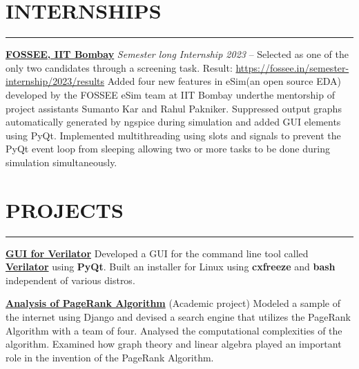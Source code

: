 \documentclass[letterpaper,MMMyyyy,nonstopmode]{simpleresumecv}
\begin{document}
    \section*{INTERNSHIPS}
        \hrule \vspace{8pt}
        {\href{https://fossee.in}{\textbf{\large FOSSEE, IIT Bombay}}
        \newline\textit{\large Semester long Internship 2023}
        }
        \hfill
        { --
        }
        \BulletItem
            Selected as one of the only two candidates through a screening task.
            \newline Result: \href{https://fossee.in/semester-internship/2023/results}{https://fossee.in/semester-internship/2023/results}
        \BulletItem
            Added four new features in eSim(an open source EDA) developed by the FOSSEE eSim team at IIT Bombay under\newline the mentorship of project assistants Sumanto Kar and Rahul Pakniker.
        \BulletItem
            Suppressed output graphs automatically generated by ngspice during simulation and added GUI elements using PyQt.
        \BulletItem
            Implemented multithreading using slots and signals to prevent the PyQt event loop from sleeping allowing two or more tasks to be done during simulation simultaneously.

    \section*{PROJECTS}
        \hrule \vspace{8pt}
        {\href{https://github.com/pranavkaruvally/linux_package_management_system}
        {\textbf{\large GUI for Verilator}} 
        } \hfill
        \BulletItem
            Developed a GUI for the command line tool called \href{https://www.veripool.org/verilator/}
            {\bfseries Verilator} using \textbf{PyQt}.
        \BulletItem
            Built an installer for Linux using \textbf{cxfreeze} and \textbf{bash} independent of various distros.
        \vspace{5pt}
        
        {\href{https://github.com/pranavkaruvally/PageRankProject}
        {\textbf{\large Analysis of PageRank Algorithm}} 
        (Academic project)
        } \hfill
        \BulletItem
            Modeled a sample of the internet using Django and devised a search engine that utilizes the PageRank \\ Algorithm with a team of four.
        \BulletItem
            Analysed the computational complexities of the algorithm.
        \BulletItem
            Examined how graph theory and linear algebra played an important role in the invention of the PageRank Algorithm.
        \vspace{5pt}
        
\end{document}
